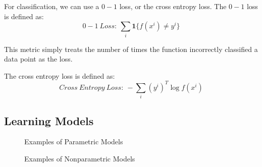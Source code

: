 \documentclass[twoside]{article}
\begin{document}
For classification, we can use a $0-1$ loss, or the cross entropy loss. The $0-1$ loss is defined as:
$$0-1 \ Loss: \ \sum_{i} \textbf{1} \{f(x^i) \neq y^i \}$$

This metric simply treats the number of times the function incorrectly classified a data point as the loss.

The cross entropy loss is defined as:
$$Cross\ Entropy\ Loss: \ -\sum_{i} (y^i)^T \log{f(x^i)}$$

\subsection{Learning Models}

\begin{figure}[!ht]%
    \centering
    \qquad
    \caption{Examples of Parametric Models}%
    \label{fig:parametric_models}%
    \qquad
    \caption{Examples of Nonparametric Models}%
    \label{fig:nonparametric_models}%
\end{figure}
\end{document}
